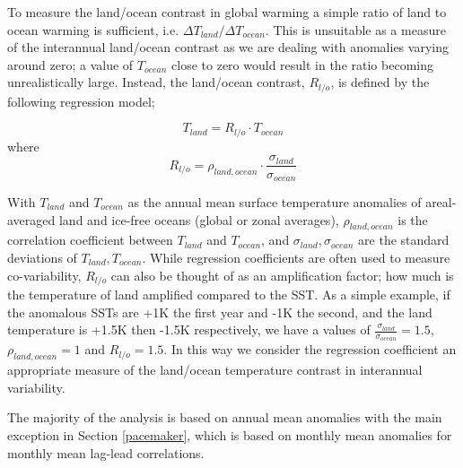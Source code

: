 To measure the land/ocean contrast in global warming a simple ratio of land to 
ocean warming is sufficient, i.e. $\Delta T_{land}/\Delta T_{ocean}$. This is 
unsuitable as a measure of the interannual land/ocean contrast as we are dealing 
with anomalies varying around zero; a value of $T_{ocean}$ close to zero would 
result in the ratio becoming unrealistically large. Instead, the land/ocean 
contrast, $R_{l/o}$, is defined by the following regression model;

\begin{equation}
T_{land} = R_{l/o} \cdot T_{ocean}
\end{equation}
where
\begin{equation}
	R_{l/o} = \rho_{land,ocean}\cdot \frac{\sigma_{land}}{\sigma_{ocean}}
\end{equation}

With $T_{land}$ and $T_{ocean}$ as the annual mean surface temperature anomalies 
of areal-averaged land and ice-free oceans (global or zonal averages), 
$\rho_{land,ocean}$ is the correlation coefficient between $T_{land}$ and 
$T_{ocean}$, and $\sigma_{land}, \sigma_{ocean}$ are the standard deviations of 
$T_{land}, T_{ocean}$. While regression coefficients are often used to measure 
co-variability, $R_{l/o}$ can also be thought of as an amplification factor; how 
much is the temperature of land amplified compared to the SST.  As a simple 
example, if the anomalous SSTs are +1K the first year and -1K the second, and 
the land temperature is +1.5K then -1.5K respectively, we have a values of $ 
\frac{\sigma_{land}}{\sigma_{ocean}}=1.5$, $\rho_{land,ocean} = 1$ and $R_{l/o} 
= 
1.5$. In this way we consider the regression coefficient an appropriate measure 
of the land/ocean temperature contrast in interannual variability.

The majority of the analysis is based on annual mean anomalies with the main 
exception in Section \ref{pacemaker}, which is based on monthly mean anomalies 
for monthly mean lag-lead correlations. 
